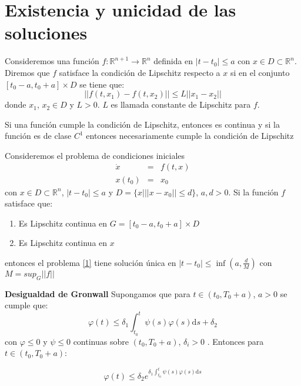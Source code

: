 \section{Existencia y unicidad de las soluciones}

\begin{definitionT}
Consideremos una función $f:\mathbb{R}^{n+1}\longrightarrow\mathbb{R}^n$ definida en $|t-t_0|\leq a$ con $x\in D\subset\mathbb{R}^n$. Diremos que $f$ satisface la condición de Lipschitz respecto a $x$ si en el conjunto $\left[t_0-a,t_0+a\right]\times D$ se tiene que:
$$
||f(t,x_1)-f(t,x_2) ||\leq L ||x_1-x_2||
$$
donde $x_1$, $x_2\in D$ y $L>0$. $L$ es llamada constante de Lipschitz para $f$.
\end{definitionT}

\begin{obsT}
Si una función cumple la condición de Lipschitz, entonces es continua y si la función es de clase $C^1$ entonces necesariamente cumple la condición de Lipschitz
\end{obsT}

\begin{theoremeT}
Consideremos el problema de condiciones iniciales
\begin{eqnarray}
\dot{x}&=&f(t,x)\nonumber\\
x(t_0)&=&x_0\label{1}
\end{eqnarray}
con $x\in D\subset\mathbb{R}^n$, $|t-t_0|\leq a$ y $D=\{x | ||x-x_0||\leq d\}$, $a,d>0$. Si la función $f$ satisface que:
\begin{enumerate}
    \item Es Lipschitz continua en $G=[t_0-a,t_0+a]\times D$
    \item Es Lipschitz continua en $x$
\end{enumerate}
entonces el problema \ref{1} tiene solución única en $|t-t_0|\leq \inf (a,\frac{d}{M})$ con $M=sup_{G} ||f||$

\end{theoremeT}

\begin{theoremeT}{\bf Desigualdad de Gronwall}
Supongamos que para $t\in(t_0,T_0+a)$, $a>0$ se cumple que:
$$
\varphi(t)\leq \delta_1\int_{t_0}^{t}\psi(s)\varphi(s)\mathrm{d}s +\delta_2
$$
con $\varphi\leq 0$ y $\psi\leq 0$ continuas sobre $(t_0,T_0+a)$, $\delta_i >0$ . Entonces para $t\in (t_0,T_0+a)$:

$$
\varphi(t)\leq \delta_2e^{\delta_1\int_{t_0}^{t}\psi(s)\varphi(s)\mathrm{d}s}
$$

\end{theoremeT}

